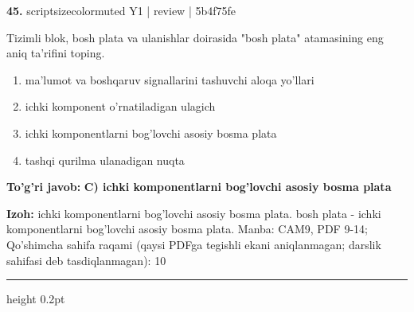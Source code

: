 \documentclass[10pt,a4paper]{article}
\begin{document}
{\bfseries\sffamily\color{ink} 45.} {scriptsizecolor{muted} Y1 | review | 5b4f75fe}
\par
Tizimli blok, bosh plata va ulanishlar doirasida "bosh plata" atamasining eng aniq ta'rifini toping.
\begin{enumerate}[label=\Alph*),leftmargin=9mm]
\item ma'lumot va boshqaruv signallarini tashuvchi aloqa yo'llari
\item ichki komponent o'rnatiladigan ulagich
\item ichki komponentlarni bog'lovchi asosiy bosma plata
\item tashqi qurilma ulanadigan nuqta
\end{enumerate}
\begin{tcolorbox}[enhanced,breakable,colback=teal!4,colframe=teal!60!black,boxrule=0.45pt,arc=1.2mm,left=2.7mm,right=2.7mm,top=1.8mm,bottom=1.8mm,before skip=2mm,after skip=2mm]
{\bfseries\sffamily\color{teal}To'g'ri javob:} \textbf{C) ichki komponentlarni bog'lovchi asosiy bosma plata}
\par\smallskip
{\bfseries Izoh:} ichki komponentlarni bog'lovchi asosiy bosma plata. bosh plata - ichki komponentlarni bog'lovchi asosiy bosma plata. Manba: CAM9, PDF 9-14; Qo'shimcha sahifa raqami (qaysi PDFga tegishli ekani aniqlanmagan; darslik sahifasi deb tasdiqlanmagan): 10
\end{tcolorbox}
\vspace{2mm}\hrule height 0.2pt\vspace{3mm}
\end{document}
